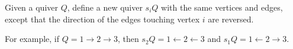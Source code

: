 Given a quiver $Q$, define a new quiver $s_iQ$ with the same vertices and
edges, except that the direction of the edges touching vertex $i$ are reversed.

For example, if $Q = 1\to 2\to 3$, then $s_2Q = 1\leftarrow 2\leftarrow 3$ and
$s_1Q = 1\leftarrow 2\to 3$.
